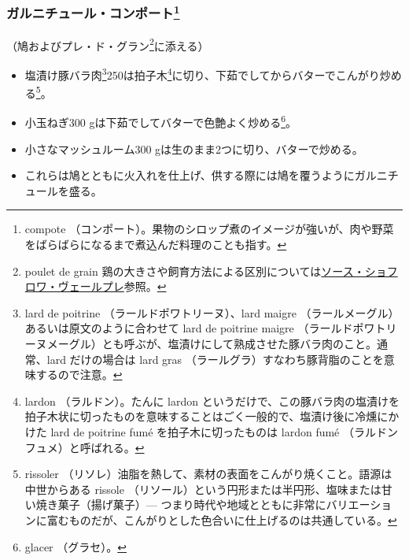 \begin{recette}
\hypertarget{garniture-de-compote}{%
\subsubsection[ガルニチュール・コンポート]{\texorpdfstring{ガルニチュール・コンポート\footnote{compote
  （コンポート）。果物のシロップ煮のイメージが強いが、肉や野菜をばらばらになるまで煮込んだ料理のことも指す。}}{ガルニチュール・コンポート}}\label{garniture-de-compote}}



（鳩およびプレ・ド・グラン\footnote{poulet de grain
  鶏の大きさや飼育方法による区別については\protect\hyperlink{sauce-chaud-froid-vert-pre}{ソース・ショフロワ・ヴェールプレ}参照。}に添える）

\begin{itemize}
\item
  塩漬け豚バラ肉\footnote{lard de poitrine
    （ラールドポワトリーヌ）、lard maigre
    （ラールメーグル）あるいは原文のように合わせて lard de poitrine
    maigre
    （ラールドポワトリーヌメーグル）とも呼ぶが、塩漬けにして熟成させた豚バラ肉のこと。通常、lard
    だけの場合は lard gras
    （ラールグラ）すなわち豚背脂のことを意味するので注意。}250は拍子木\footnote{lardon
    （ラルドン）。たんに lardon
    というだけで、この豚バラ肉の塩漬けを拍子木状に切ったものを意味することはごく一般的で、塩漬け後に冷燻にかけた
    lard de poitrine fumé を拍子木に切ったものは lardon fumé
    （ラルドンフュメ）と呼ばれる。}に切り、下茹でしてからバターでこんがり炒める\footnote{rissoler
    （リソレ）油脂を熱して、素材の表面をこんがり焼くこと。語源は中世からある
    rissole
    （リソール）という円形または半円形、塩味または甘い焼き菓子（揚げ菓子）---
    つまり時代や地域とともに非常にバリエーションに富むものだが、こんがりとした色合いに仕上げるのは共通している。}。
\item
  小玉ねぎ300 gは下茹でしてバターで色艶よく炒める\footnote{glacer
    （グラセ）。}。
\item
  小さなマッシュルーム300 gは生のまま2つに切り、バターで炒める。
\item
  これらは鳩とともに火入れを仕上げ、供する際には鳩を覆うようにガルニチュールを盛る。
\end{itemize}


\end{recette}
